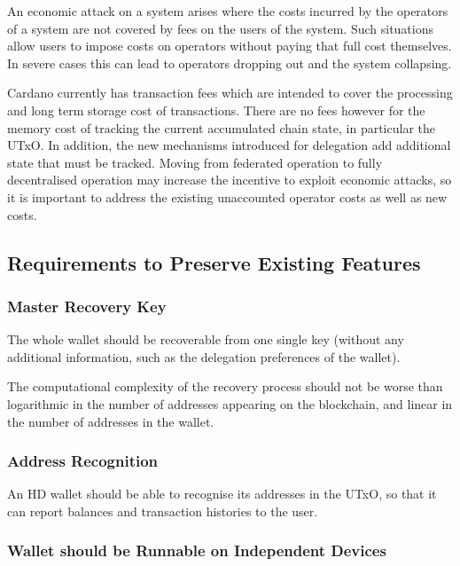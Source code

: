 \documentclass[11pt,a4paper]{article}
\begin{document}
An economic attack on a system arises where the costs incurred by the
operators of a system are not covered by fees on the users of the
system. Such situations allow users to impose costs on operators without
paying that full cost themselves. In severe cases this can lead to
operators dropping out and the system collapsing.

Cardano currently has transaction fees which are intended to cover the
processing and long term storage cost of transactions. There are no fees
however for the memory cost of tracking the current accumulated chain
state, in particular the UTxO. In addition, the new mechanisms
introduced for delegation add additional state that must be tracked.
Moving from federated operation to fully decentralised operation may
increase the incentive to exploit economic attacks, so it is important
to address the existing unaccounted operator costs as well as new costs.

\subsection{Requirements to Preserve Existing Features}
\label{requirements-to-preserve-existing-features}

\subsubsection{Master Recovery Key}
\label{master-recovery-key}

The whole wallet should be recoverable from one single key (without any
additional information, such as the delegation preferences of the
wallet).

The computational complexity of the recovery process should not be worse
than logarithmic in the number of addresses appearing on the blockchain,
and linear in the number of addresses in the wallet.

\subsubsection{Address Recognition}
\label{address-recognition}

An HD wallet should be able to recognise its addresses in the UTxO, so
that it can report balances and transaction histories to the user.

\subsubsection{Wallet should be Runnable on Independent Devices}
\label{wallet-should-be-runnable-on-independent-devices}
\end{document}
